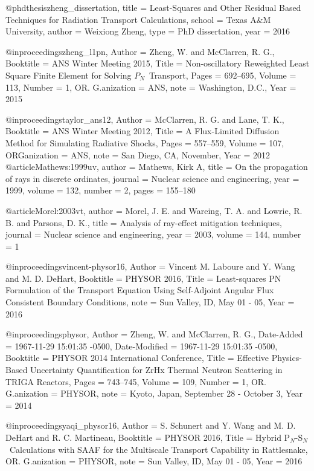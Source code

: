 @phdthesis{zheng_dissertation,
	title    = {Least-Squares and Other Residual Based Techniques for Radiation Transport Calculations},
	school   = {Texas A\&M University},
	author   = {Weixiong Zheng},
	type     = {{PhD} dissertation},
	year     = {2016}
}

@inproceedings{zheng_l1pn,
	Author = {Zheng, W. and McClarren, R. G.},
	Booktitle = {{ANS Winter Meeting 2015}},
	Title = {{Non-oscillatory Reweighted Least Square Finite Element for Solving $P_N$\ Transport}},
	Pages = {692--695},
	Volume = {113},
	Number = {1},
	OR. G.anization   = {ANS},
	note           = {Washington, D.C.},
	Year = {2015}}

@inproceedings{taylor_ans12,
	Author = {McClarren, R. G. and Lane, T. K.},
	Booktitle = {{ANS Winter Meeting 2012}},
	Title = {{A Flux-Limited Diffusion Method for Simulating Radiative Shocks}},
	Pages = {557--559},
	Volume = {107},
	ORGanization   = {ANS},
	note           = {San Diego, CA, November},
	Year = {2012}}
@article{Mathews:1999uv,
author = {Mathews, Kirk A},
title = {{On the propagation of rays in discrete ordinates}},
journal = {Nuclear science and engineering},
year = {1999},
volume = {132},
number = {2},
pages = {155--180}
}

@article{Morel:2003vt,
author = {Morel, J. E. and Wareing, T. A. and Lowrie, R. B. and Parsons, D. K.},
title = {{Analysis of ray-effect mitigation techniques}},
journal = {Nuclear science and engineering},
year = {2003},
volume = {144},
number = {1}
}

@inproceedings{vincent-physor16,
	Author = {Vincent M. Laboure and Y. Wang and M. D. DeHart},
	Booktitle = {{PHYSOR 2016}},
	Title = {Least-squares PN Formulation of the Transport Equation Using Self-Adjoint Angular Flux Consistent Boundary Conditions},
	note           = {Sun Valley, ID, May 01 - 05},
	Year = {2016}}

@inproceedings{physor,
	Author = {Zheng, W. and McClarren, R. G.},
	Date-Added = {1967-11-29 15:01:35 -0500},
	Date-Modified = {1967-11-29 15:01:35 -0500},
	Booktitle = {{PHYSOR 2014 International Conference}},
	Title = {{Effective Physics-Based Uncertainty Quantification for ZrHx Thermal Neutron Scattering in TRIGA Reactors}},
	Pages = {743--745},
	Volume = {109},
	Number = {1},
	OR. G.anization   = {PHYSOR},
	note           = {Kyoto, Japan, September 28 - October 3},
	Year = {2014}}
	
@inproceedings{yaqi_physor16,
	Author = {S. Schunert and Y. Wang and M. D. DeHart and R. C. Martineau},
	Booktitle = {{PHYSOR 2016}},
	Title = {{Hybrid P$_N$-S$_N$\ Calculations with SAAF for the Multiscale Transport Capability in Rattlesnake}},
	OR. G.anization   = {PHYSOR},
	note           = {Sun Valley, ID, May 01 - 05},
	Year = {2016}}

